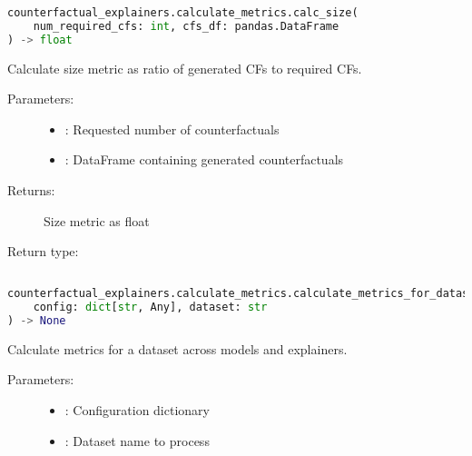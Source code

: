 \begin{lstlisting}[language=Python, caption={Function Signature}]
counterfactual_explainers.calculate_metrics.calc_size(
    num_required_cfs: int, cfs_df: pandas.DataFrame
) -> float
\end{lstlisting}

Calculate size metric as ratio of generated CFs to required CFs.

\begin{description}
    \item[Parameters:]
        \begin{itemize}
            \item {}: Requested number of counterfactuals
            \item {}: DataFrame containing generated counterfactuals
        \end{itemize}
    \item[Returns:] Size metric as float
    \item[Return type:] 
\end{description}


\subsection{}
\label{func:calculate_metrics_for_dataset}

\begin{lstlisting}[language=Python, caption={Function Signature}]
counterfactual_explainers.calculate_metrics.calculate_metrics_for_dataset(
    config: dict[str, Any], dataset: str
) -> None
\end{lstlisting}

Calculate metrics for a dataset across models and explainers.

\begin{description}
    \item[Parameters:]
        \begin{itemize}
            \item {}: Configuration dictionary
            \item {}: Dataset name to process
        \end{itemize}
\end{description}

